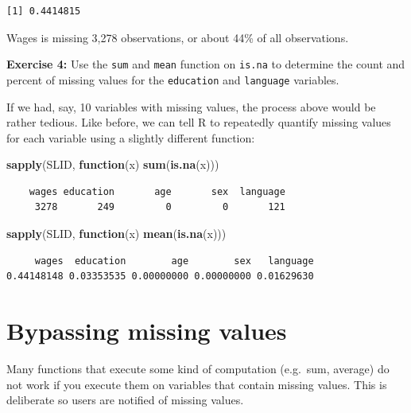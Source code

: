 \documentclass[
]{book}
\makeatletter
\newenvironment{Shaded}{\begin{snugshade}}{\end{snugshade}}
\newcommand{\ControlFlowTok}[1]{\textcolor[rgb]{0.27,0.27,0.27}{\textbf{#1}}}
\newcommand{\FunctionTok}[1]{\textcolor[rgb]{0.27,0.27,0.27}{\textbf{#1}}}
\newcommand{\NormalTok}[1]{#1}
\newenvironment{kframe}{%
\medskip{}
\setlength{\fboxsep}{.8em}
 \def\at@end@of@kframe{}%
 \ifinner\ifhmode%
  \def\at@end@of@kframe{\end{minipage}}%
  \begin{minipage}{\columnwidth}%
 \fi\fi%
 \def\FrameCommand##1{\hskip\@totalleftmargin \hskip-\fboxsep
 \colorbox{shadecolor}{##1}\hskip-\fboxsep
     \hskip-\linewidth \hskip-\@totalleftmargin \hskip\columnwidth}%
 \MakeFramed {\advance\hsize-\width
   \@totalleftmargin\z@ \linewidth\hsize
   \@setminipage}}%
 {\par\unskip\endMakeFramed%
 \at@end@of@kframe}
\renewenvironment{Shaded}{\begin{kframe}}{\end{kframe}}
\newenvironment{rmdblock}[1]
  {\begin{shaded*}
  }
  {\end{shaded*}
  }
\newenvironment{learncheck}
  {\begin{rmdblock}{warning}}
  {\end{rmdblock}}
\makeatother
\begin{document}
\begin{verbatim}
[1] 0.4414815
\end{verbatim}

Wages is missing 3,278 observations, or about 44\% of all observations.

\begin{learncheck}
\textbf{Exercise 4:} Use the \texttt{sum} and \texttt{mean} function on
\texttt{is.na} to determine the count and percent of missing values for
the \texttt{education} and \texttt{language} variables.
\end{learncheck}

If we had, say, 10 variables with missing values, the process above would be rather tedious. Like before, we can tell R to repeatedly quantify missing values for each variable using a slightly different function:

\begin{Shaded}
\begin{Highlighting}[]
\FunctionTok{sapply}\NormalTok{(SLID, }\ControlFlowTok{function}\NormalTok{(x) }\FunctionTok{sum}\NormalTok{(}\FunctionTok{is.na}\NormalTok{(x)))}
\end{Highlighting}
\end{Shaded}

\begin{verbatim}
    wages education       age       sex  language 
     3278       249         0         0       121 
\end{verbatim}

\begin{Shaded}
\begin{Highlighting}[]
\FunctionTok{sapply}\NormalTok{(SLID, }\ControlFlowTok{function}\NormalTok{(x) }\FunctionTok{mean}\NormalTok{(}\FunctionTok{is.na}\NormalTok{(x)))}
\end{Highlighting}
\end{Shaded}

\begin{verbatim}
     wages  education        age        sex   language 
0.44148148 0.03353535 0.00000000 0.00000000 0.01629630 
\end{verbatim}

\hypertarget{bypassing-missing-values}{%
\section{Bypassing missing values}\label{bypassing-missing-values}}

Many functions that execute some kind of computation (e.g.~sum, average) do not work if you execute them on variables that contain missing values. This is deliberate so users are notified of missing values.
\end{document}
